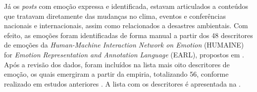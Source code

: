 \documentclass[portuguese]{textolivre}
\begin{document}
Já os \textit{posts} com emoção expressa e identificada, estavam articulados a conteúdos que tratavam diretamente das mudanças no clima, eventos e conferências nacionais e internacionais, assim como relacionados a desastres ambientais. Com efeito, as emoções foram identificadas de forma manual a partir dos 48 descritores de emoções da \textit{Human-Machine Interaction Network on Emotion} (HUMAINE) for \textit{Emotion Representation and Annotation Language} (EARL), propostos em \textcite{douglas2007humaine,schroder2006emotion}. Após a revisão dos dados, foram incluídos na lista mais oito descritores de emoção, os quais emergiram a partir da empiria, totalizando 56, conforme realizado em estudos anteriores \cite{fernandesdeoliveira2023vacina,fernandesdeoliveira2024kwai}. A lista com os descritores é apresentada na .
\end{document}

